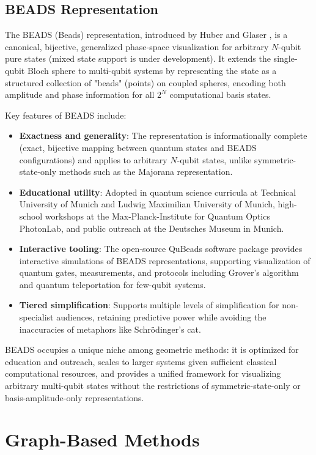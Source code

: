 \documentclass[%
 amsmath,amssymb,
 aps,
rmp,
]{revtex4-2}
\begin{document}
\subsection{BEADS Representation}
\label{sec:beads}

The BEADS (Beads) representation, introduced by Huber and Glaser \cite{huber2025beads}, is a canonical, bijective, generalized phase-space visualization for arbitrary $N$-qubit pure states (mixed state support is under development). It extends the single-qubit Bloch sphere to multi-qubit systems by representing the state as a structured collection of "beads" (points) on coupled spheres, encoding both amplitude and phase information for all $2^N$ computational basis states.

Key features of BEADS include:
\begin{itemize}
    \item \textbf{Exactness and generality}: The representation is informationally complete (exact, bijective mapping between quantum states and BEADS configurations) and applies to arbitrary $N$-qubit states, unlike symmetric-state-only methods such as the Majorana representation.
    \item \textbf{Educational utility}: Adopted in quantum science curricula at Technical University of Munich and Ludwig Maximilian University of Munich, high-school workshops at the Max-Planck-Institute for Quantum Optics PhotonLab, and public outreach at the Deutsches Museum in Munich.
    \item \textbf{Interactive tooling}: The open-source QuBeads software package provides interactive simulations of BEADS representations, supporting visualization of quantum gates, measurements, and protocols including Grover's algorithm and quantum teleportation for few-qubit systems.
    \item \textbf{Tiered simplification}: Supports multiple levels of simplification for non-specialist audiences, retaining predictive power while avoiding the inaccuracies of metaphors like Schrödinger's cat.
\end{itemize}

BEADS occupies a unique niche among geometric methods: it is optimized for education and outreach, scales to larger systems given sufficient classical computational resources, and provides a unified framework for visualizing arbitrary multi-qubit states without the restrictions of symmetric-state-only or basis-amplitude-only representations.

\section{Graph-Based Methods}
\label{sec:graph}
\end{document}
